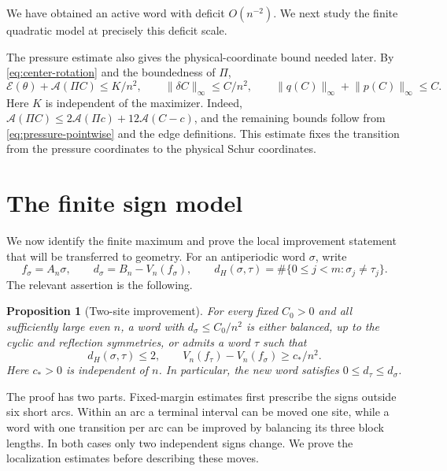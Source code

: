 \documentclass[11pt,reqno]{amsart}
\numberwithin{equation}{section}
\newtheorem{proposition}[theorem]{Proposition}
\theoremstyle{definition}
\theoremstyle{remark}
\newcommand{\A}{\mathcal A}
\newcommand{\E}{\mathcal E}
\newcommand{\norm}[1]{\lVert #1\rVert}
\newcommand{\dd}{\delta}
\begin{document}
We have obtained an active word with deficit $O(n^{-2})$. We next study the finite quadratic model at precisely this deficit scale.

The pressure estimate also gives the physical-coordinate bound needed later. By \eqref{eq:center-rotation} and the boundedness of $\Pi$,
\begin{equation}\label{eq:physical-fiber-input}
 \E(\theta)+\A(\Pi C)\le K/n^2,\qquad
 \norm{\dd C}_\infty\le C/n^2,\qquad
 \norm{q(C)}_\infty+\norm{p(C)}_\infty\le C.
\end{equation}
Here $K$ is independent of the maximizer. Indeed,
$\A(\Pi C)\le2\A(\Pi c)+12\A(C-c)$, and the remaining bounds follow from
\eqref{eq:pressure-pointwise} and the edge definitions. This estimate fixes the transition from the pressure coordinates to the physical Schur coordinates.


\section{The finite sign model}\label{sec:selection}
We now identify the finite maximum and prove the local improvement statement that will be transferred to geometry. For an antiperiodic word $\sigma$, write
\[
 f_\sigma=A_n\sigma,\qquad d_\sigma=B_n-V_n(f_\sigma),\qquad
 d_H(\sigma,\tau)=\#\{0\le j<m:\sigma_j\ne\tau_j\}.
\]
The relevant assertion is the following.

\begin{proposition}[Two-site improvement]\label{prop:finite-improvement}
For every fixed $C_0>0$ and all sufficiently large even $n$, a word with $d_\sigma\le C_0/n^2$ is either balanced, up to the cyclic and reflection symmetries, or admits a word $\tau$ such that
\begin{equation}\label{eq:finite-improvement}
 d_H(\sigma,\tau)\le2,\qquad
 V_n(f_\tau)-V_n(f_\sigma)\ge c_*/n^2.
\end{equation}
Here $c_*>0$ is independent of $n$. In particular, the new word satisfies $0\le d_\tau\le d_\sigma$.
\end{proposition}

The proof has two parts. Fixed-margin estimates first prescribe the signs outside six short arcs. Within an arc a terminal interval can be moved one site, while a word with one transition per arc can be improved by balancing its three block lengths. In both cases only two independent signs change. We prove the localization estimates before describing these moves.
\end{document}
